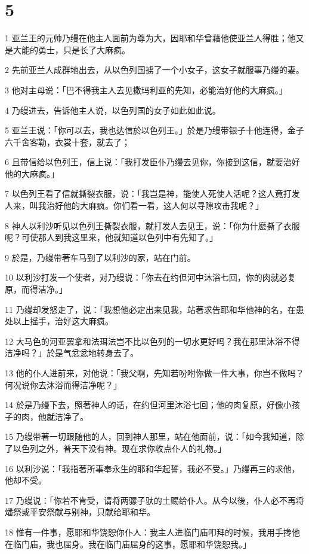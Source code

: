 \chapter{5}

\par 1 亚兰王的元帅乃缦在他主人面前为尊为大，因耶和华曾藉他使亚兰人得胜；他又是大能的勇士，只是长了大麻疯。
\par 2 先前亚兰人成群地出去，从以色列国掳了一个小女子，这女子就服事乃缦的妻。
\par 3 他对主母说：「巴不得我主人去见撒玛利亚的先知，必能治好他的大麻疯。」
\par 4 乃缦进去，告诉他主人说，以色列国的女子如此如此说。
\par 5 亚兰王说：「你可以去，我也达信於以色列王。」於是乃缦带银子十他连得，金子六千舍客勒，衣裳十套，就去了；
\par 6 且带信给以色列王，信上说：「我打发臣仆乃缦去见你，你接到这信，就要治好他的大麻疯。」
\par 7 以色列王看了信就撕裂衣服，说：「我岂是神，能使人死使人活呢？这人竟打发人来，叫我治好他的大麻疯。你们看一看，这人何以寻隙攻击我呢？」
\par 8 神人以利沙听见以色列王撕裂衣服，就打发人去见王，说：「你为什麽撕了衣服呢？可使那人到我这里来，他就知道以色列中有先知了。」
\par 9 於是，乃缦带著车马到了以利沙的家，站在门前。
\par 10 以利沙打发一个使者，对乃缦说：「你去在约但河中沐浴七回，你的肉就必复原，而得洁净。」
\par 11 乃缦却发怒走了，说：「我想他必定出来见我，站著求告耶和华他神的名，在患处以上摇手，治好这大麻疯。
\par 12 大马色的河亚罢拿和法珥法岂不比以色列的一切水更好吗？我在那里沐浴不得洁净吗？」於是气忿忿地转身去了。
\par 13 他的仆人进前来，对他说：「我父啊，先知若吩咐你做一件大事，你岂不做吗？何况说你去沐浴而得洁净呢？」
\par 14 於是乃缦下去，照著神人的话，在约但河里沐浴七回；他的肉复原，好像小孩子的肉，他就洁净了。
\par 15 乃缦带著一切跟随他的人，回到神人那里，站在他面前，说：「如今我知道，除了以色列之外，普天下没有神。现在求你收点仆人的礼物。」
\par 16 以利沙说：「我指著所事奉永生的耶和华起誓，我必不受。」乃缦再三的求他，他却不受。
\par 17 乃缦说：「你若不肯受，请将两骡子驮的土赐给仆人。从今以後，仆人必不再将燔祭或平安祭献与别神，只献给耶和华。
\par 18 惟有一件事，愿耶和华饶恕你仆人：我主人进临门庙叩拜的时候，我用手搀他在临门庙，我也屈身。我在临门庙屈身的这事，愿耶和华饶恕我。」
